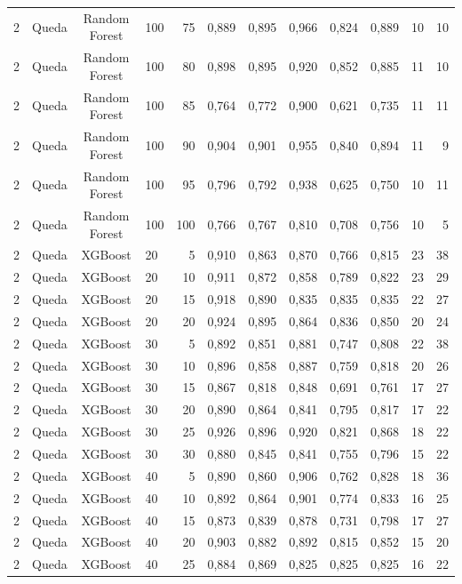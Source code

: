 \begin{longtable}{ccclrrrrrrrr}
2 & Queda & Random Forest & 100 & 75 & 0,889 & 0,895 & 0,966 & 0,824 & 0,889 & 10 & 10 \\
2 & Queda & Random Forest & 100 & 80 & 0,898 & 0,895 & 0,920 & 0,852 & 0,885 & 11 & 10 \\
2 & Queda & Random Forest & 100 & 85 & 0,764 & 0,772 & 0,900 & 0,621 & 0,735 & 11 & 11 \\
2 & Queda & Random Forest & 100 & 90 & 0,904 & 0,901 & 0,955 & 0,840 & 0,894 & 11 & 9 \\
2 & Queda & Random Forest & 100 & 95 & 0,796 & 0,792 & 0,938 & 0,625 & 0,750 & 10 & 11 \\
2 & Queda & Random Forest & 100 & 100 & 0,766 & 0,767 & 0,810 & 0,708 & 0,756 & 10 & 5 \\
2 & Queda & XGBoost & 20 & 5 & 0,910 & 0,863 & 0,870 & 0,766 & 0,815 & 23 & 38 \\
2 & Queda & XGBoost & 20 & 10 & 0,911 & 0,872 & 0,858 & 0,789 & 0,822 & 23 & 29 \\
2 & Queda & XGBoost & 20 & 15 & 0,918 & 0,890 & 0,835 & 0,835 & 0,835 & 22 & 27 \\
2 & Queda & XGBoost & 20 & 20 & 0,924 & 0,895 & 0,864 & 0,836 & 0,850 & 20 & 24 \\
2 & Queda & XGBoost & 30 & 5 & 0,892 & 0,851 & 0,881 & 0,747 & 0,808 & 22 & 38 \\
2 & Queda & XGBoost & 30 & 10 & 0,896 & 0,858 & 0,887 & 0,759 & 0,818 & 20 & 26 \\
2 & Queda & XGBoost & 30 & 15 & 0,867 & 0,818 & 0,848 & 0,691 & 0,761 & 17 & 27 \\
2 & Queda & XGBoost & 30 & 20 & 0,890 & 0,864 & 0,841 & 0,795 & 0,817 & 17 & 22 \\
2 & Queda & XGBoost & 30 & 25 & 0,926 & 0,896 & 0,920 & 0,821 & 0,868 & 18 & 22 \\
2 & Queda & XGBoost & 30 & 30 & 0,880 & 0,845 & 0,841 & 0,755 & 0,796 & 15 & 22 \\
2 & Queda & XGBoost & 40 & 5 & 0,890 & 0,860 & 0,906 & 0,762 & 0,828 & 18 & 36 \\
2 & Queda & XGBoost & 40 & 10 & 0,892 & 0,864 & 0,901 & 0,774 & 0,833 & 16 & 25 \\
2 & Queda & XGBoost & 40 & 15 & 0,873 & 0,839 & 0,878 & 0,731 & 0,798 & 17 & 27 \\
2 & Queda & XGBoost & 40 & 20 & 0,903 & 0,882 & 0,892 & 0,815 & 0,852 & 15 & 20 \\
2 & Queda & XGBoost & 40 & 25 & 0,884 & 0,869 & 0,825 & 0,825 & 0,825 & 16 & 22 \\

\end{longtable}
